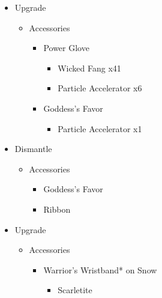 \begin{upgrade}
	\begin{itemize}
		\item Upgrade
			\begin{itemize}
				\item Accessories
					\begin{itemize}
						\item Power Glove
							\begin{itemize}
								\item Wicked Fang x41
								\item Particle Accelerator x6
							\end{itemize}
						\item Goddess's Favor
							\begin{itemize}
								\item Particle Accelerator x1
							\end{itemize}
					\end{itemize}
			\end{itemize}
		\item Dismantle
			\begin{itemize}
				\item Accessories
					\begin{itemize}
						\item Goddess's Favor
						\item Ribbon
					\end{itemize}
			\end{itemize}		
		\item Upgrade
			\begin{itemize}
				\item Accessories
					\begin{itemize}
						\item Warrior's Wristband* on Snow
							\begin{itemize}
								\item Scarletite
							\end{itemize}
					\end{itemize}
			\end{itemize}		
	\end{itemize}
\end{upgrade}

